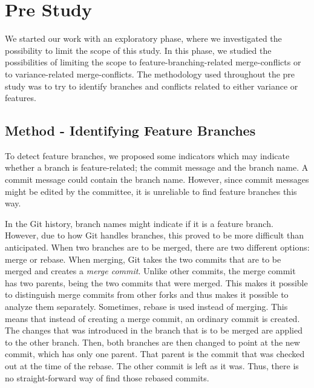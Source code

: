\chapter{Pre Study}\label{cha:prestudy}
We started our work with an exploratory phase, where we investigated the possibility to limit the scope of this study. In this phase, we studied the possibilities of limiting the scope to feature-branching-related merge-conflicts or to variance-related merge-conflicts. The methodology used throughout the pre study was to try to identify branches and conflicts related to either variance or features.

\section{Method - Identifying Feature Branches}\label{sec:ifb}
To detect feature branches, we proposed some indicators which may indicate whether a branch is feature-related; the commit message and the branch name. A commit message could contain the branch name. However, since commit messages might be edited by the committee, it is unreliable to find feature branches this way.

In the Git history, branch names might indicate if it is a feature branch. However, due to how Git handles branches, this proved to be more difficult than anticipated. When two branches are to be merged, there are two different options: merge or rebase. When merging, Git takes the two commits that are to be merged and creates a \textit{merge commit}. Unlike other commits, the merge commit has two parents, being the two commits that were merged. This makes it possible to distinguish merge commits from other forks and thus makes it possible to analyze them separately. Sometimes, rebase is used instead of merging. This means that instead of creating a merge commit, an ordinary commit is created. The changes that was introduced in the branch that is to be merged are applied to the other branch. Then, both branches are then changed to point at the new commit, which has only one parent. That parent is the commit that was checked out at the time of the rebase. The other commit is left as it was. Thus, there is no straight-forward way of find those rebased commits.

